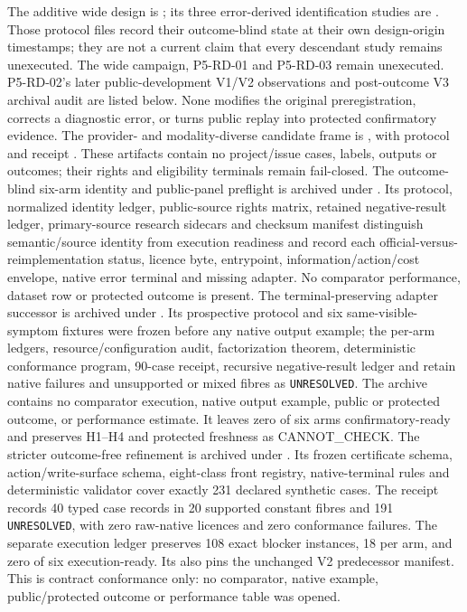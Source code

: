 The additive wide design is
; its three
error-derived identification studies are
. Those protocol
files record their outcome-blind state at their own design-origin timestamps;
they are not a current claim that every descendant study remains unexecuted.
The wide campaign, P5-RD-01 and P5-RD-03 remain unexecuted. P5-RD-02's later
public-development V1/V2 observations and post-outcome V3 archival audit are
listed below. None modifies the original preregistration, corrects a diagnostic
error, or turns public replay into protected confirmatory evidence.
The provider- and modality-diverse candidate frame is
,
with protocol
and receipt
.
These artifacts contain no project/issue cases, labels, outputs or outcomes;
their rights and eligibility terminals remain fail-closed.
The outcome-blind six-arm identity and public-panel preflight is archived under
. Its protocol,
normalized identity ledger, public-source rights matrix, retained
negative-result ledger, primary-source research sidecars and checksum manifest
distinguish semantic/source identity from execution readiness and record each
official-versus-reimplementation status, licence byte, entrypoint,
information/action/cost envelope, native error terminal and missing adapter.
No comparator performance, dataset row or protected outcome is present.
The terminal-preserving adapter successor is archived under
. Its prospective
protocol and six same-visible-symptom fixtures were frozen before any native
output example; the per-arm ledgers, resource/configuration audit,
factorization theorem, deterministic conformance program, 90-case receipt,
recursive negative-result ledger and  retain native failures
and unsupported or mixed fibres as \texttt{UNRESOLVED}. The archive contains no
comparator execution, native output example, public or protected outcome, or
performance estimate. It leaves zero of six arms confirmatory-ready and
preserves H1--H4 and protected freshness as \textsf{CANNOT\_CHECK}.
The stricter outcome-free refinement is archived under
. Its frozen
certificate schema, action/write-surface schema, eight-class front registry,
native-terminal rules and deterministic validator cover exactly 231 declared
synthetic cases. The receipt records 40 typed case records in 20 supported
constant fibres and 191 \texttt{UNRESOLVED}, with zero raw-native licences and
zero conformance failures. The separate execution ledger preserves 108 exact
blocker instances, 18 per arm, and zero of six execution-ready. Its
 also pins the unchanged V2 predecessor manifest. This is
contract conformance only: no comparator, native example, public/protected
outcome or performance table was opened.


